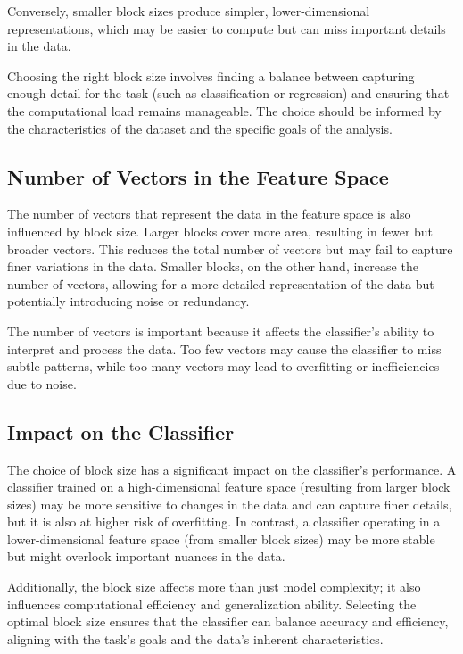\documentclass[conference,12pt]{IEEEtran}
\begin{document}
Conversely, smaller block sizes produce simpler, lower-dimensional representations, which may be easier to compute but can miss important details in the data.

Choosing the right block size involves finding a balance between capturing enough detail for the task (such as classification or regression) and ensuring that the computational load remains manageable. The choice should be informed by the characteristics of the dataset and the specific goals of the analysis.

\subsection{Number of Vectors in the Feature Space}
The number of vectors that represent the data in the feature space is also influenced by block size. Larger blocks cover more area, resulting in fewer but broader vectors. This reduces the total number of vectors but may fail to capture finer variations in the data. Smaller blocks, on the other hand, increase the number of vectors, allowing for a more detailed representation of the data but potentially introducing noise or redundancy.

The number of vectors is important because it affects the classifier’s ability to interpret and process the data. Too few vectors may cause the classifier to miss subtle patterns, while too many vectors may lead to overfitting or inefficiencies due to noise.

\subsection{Impact on the Classifier}
The choice of block size has a significant impact on the classifier's performance. A classifier trained on a high-dimensional feature space (resulting from larger block sizes) may be more sensitive to changes in the data and can capture finer details, but it is also at higher risk of overfitting. In contrast, a classifier operating in a lower-dimensional feature space (from smaller block sizes) may be more stable but might overlook important nuances in the data.

Additionally, the block size affects more than just model complexity; it also influences computational efficiency and generalization ability. Selecting the optimal block size ensures that the classifier can balance accuracy and efficiency, aligning with the task's goals and the data's inherent characteristics.
\end{document}
